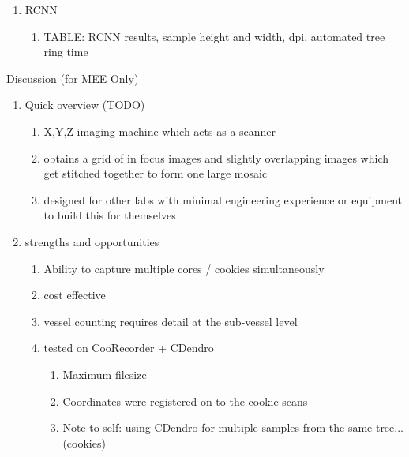 \documentclass{article}
\begin{document}
\begin{outline}[enumerate]
\begin{enumerate}
\begin{enumerate}
		\end{enumerate}
	\item RCNN
		\begin{enumerate}
		\item TABLE: RCNN results, sample height and width, dpi, automated tree ring time
		\end{enumerate}
	\end{enumerate}
\item Discussion (for MEE Only) 
	\begin{enumerate}
	\item Quick overview (TODO)
		\begin{enumerate}
		\item X,Y,Z imaging machine which acts as a scanner 
		\item obtains a grid of in focus images and slightly overlapping images which get stitched together to form one large mosaic 
		\item designed for other labs with minimal engineering experience or equipment to build this for themselves
		\end{enumerate}
	\item strengths and opportunities
		\begin{enumerate} %
		\item Ability to capture multiple cores / cookies simultaneously
		\item cost effective
		\item vessel counting requires detail at the sub-vessel level %
		\item tested on CooRecorder + CDendro
			\begin{enumerate}
			\item Maximum filesize 
			\item Coordinates were registered on to the cookie scans 
			\item Note to self: using CDendro for multiple samples from the same tree... (cookies) 
			\end{enumerate}

\end{enumerate}
\end{enumerate}
\end{outline}
\end{document}
